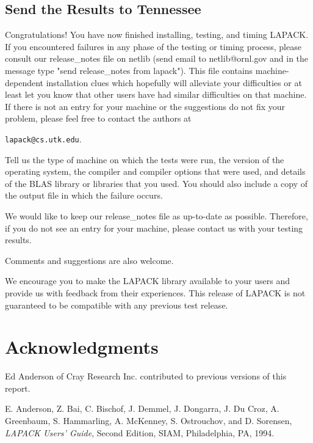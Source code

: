 \subsection{Send the Results to Tennessee}\label{sendresults}

\dent
Congratulations!  You have now finished installing, testing, and
timing LAPACK.  If you encountered failures in any phase of the 
testing or timing process, please
consult our release\_notes file on netlib (send email to netlib@ornl.gov
and in the message type "send release\_notes from lapack").  This file
contains machine-dependent installation clues which hopefully will 
alleviate your difficulties or at least let you know that other users
have had similar difficulties on that machine.  If there is not an entry
for your machine or the suggestions do not fix your problem, please feel
free to contact the authors at
\begin{list}{}{}
\item {\tt lapack@cs.utk.edu}.
\end{list}
Tell us the 
type of machine on which the tests were run, the version of the operating
system, the compiler and compiler options that were used,
and details of the BLAS library or libraries that you used.  You should
also include a copy of the output file in which the failure occurs.

We would like to keep our release\_notes file as up-to-date as possible.
Therefore, if you do not see an entry for your machine, please contact us
with your testing results.

Comments and suggestions are also welcome.

We encourage you to make the LAPACK library available to your
users and provide us with feedback from their experiences.
This release of LAPACK is not guaranteed to be compatible
with any previous test release.

\section*{Acknowledgments}

Ed Anderson of Cray Research Inc. contributed to previous versions of
this report.

\newpage
{}

E. Anderson, Z. Bai, C. Bischof, J. Demmel, J. Dongarra,
J. Du Croz, A. Greenbaum, S. Hammarling, A. McKenney,
S. Ostrouchov, and D. Sorensen, 
{\em LAPACK Users' Guide}, Second Edition,
{SIAM}, Philadelphia, PA, 1994.

